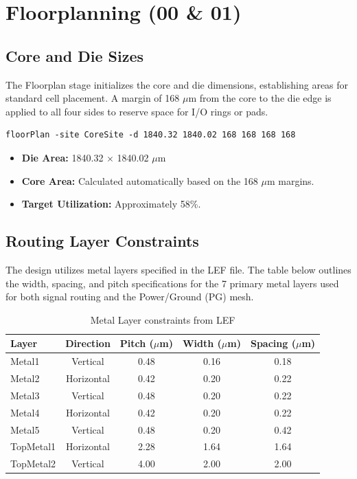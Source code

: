 \documentclass[12pt,a4paper]{article}
\begin{document}
\section{Floorplanning (00 \& 01)}

\subsection{Core and Die Sizes}
The Floorplan stage initializes the core and die dimensions, establishing areas for standard cell placement. A margin of 168 $\mu$m from the core to the die edge is applied to all four sides to reserve space for I/O rings or pads.

\begin{lstlisting}[caption={Floorplan initialization}]
floorPlan -site CoreSite -d 1840.32 1840.02 168 168 168 168
\end{lstlisting}

\begin{itemize}
    \item \textbf{Die Area:} 1840.32 $\times$ 1840.02 $\mu$m
    \item \textbf{Core Area:} Calculated automatically based on the 168 $\mu$m margins.
    \item \textbf{Target Utilization:} Approximately 58\%.
\end{itemize}

\subsection{Routing Layer Constraints}
The design utilizes metal layers specified in the LEF file. The table below outlines the width, spacing, and pitch specifications for the 7 primary metal layers used for both signal routing and the Power/Ground (PG) mesh.

\begin{table}[H]
    \centering
    \caption{Metal Layer constraints from LEF}
    \label{tab:metal_rules}
    \begin{tabular}{|l|c|c|c|c|}
        \hline
        \textbf{Layer} & \textbf{Direction} & \textbf{Pitch ($\mu$m)} & \textbf{Width ($\mu$m)} & \textbf{Spacing ($\mu$m)} \\
        \hline
        Metal1 & Vertical & 0.48 & 0.16 & 0.18 \\
        Metal2 & Horizontal & 0.42 & 0.20 & 0.22 \\
        Metal3 & Vertical & 0.48 & 0.20 & 0.22 \\
        Metal4 & Horizontal & 0.42 & 0.20 & 0.22 \\
        Metal5 & Vertical & 0.48 & 0.20 & 0.42 \\
        TopMetal1 & Horizontal & 2.28 & 1.64 & 1.64 \\
        TopMetal2 & Vertical & 4.00 & 2.00 & 2.00 \\
        \hline
    \end{tabular}
\end{table}
\end{document}
